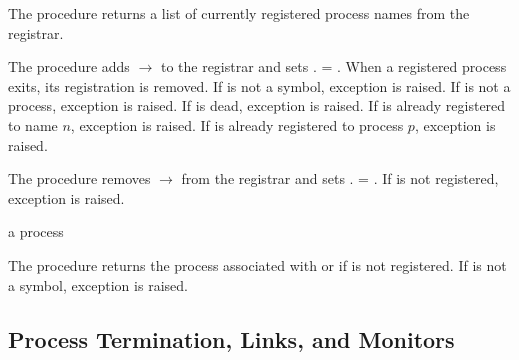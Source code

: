 The  procedure returns a list of currently
registered process names from the registrar.

\begin{procedure}
\end{procedure}
\returns{} 

The  procedure adds  $\rightarrow$
 to the registrar and sets . =
. When a registered process exits, its registration is
removed. If  is not a symbol, exception  is raised. If  is not a process,
exception  is raised. If
 is dead, exception 
is raised. If  is already registered to name $n$,
exception  is raised. If
 is already registered to process $p$, exception
 is raised.

\begin{procedure}
\end{procedure}
\returns{} 

The  procedure removes  $\rightarrow$
 from the registrar and sets .
= .  If  is not registered, exception
 is raised.

\begin{procedure}
\end{procedure}
\returns{} a process \alt{} 

The  procedure returns the process associated with
 or  if  is not registered.  If
 is not a symbol, exception  is raised.

\subsection {Process Termination, Links, and Monitors}

